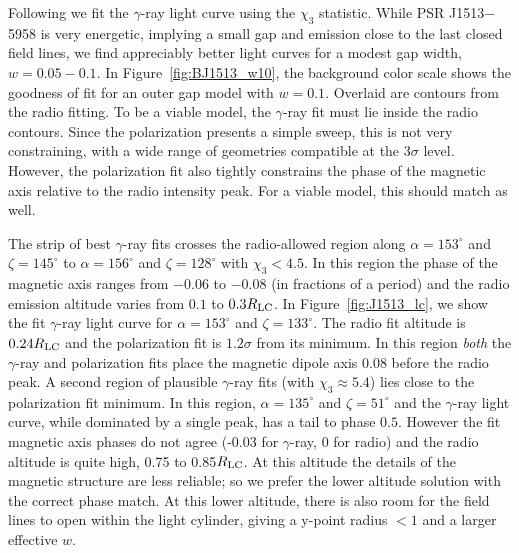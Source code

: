 Following \cite{romani2010constraining} we fit the $\gamma$-ray
light curve using the $\chi_3$ statistic. While PSR J1513$-$5958 is
very energetic, implying a small gap and emission close to the last closed
field lines, we find appreciably better light curves for a modest gap width,
$w=0.05-0.1$. In Figure~\ref{fig:BJ1513_w10}, the background color scale shows the goodness of
fit for an outer gap  model with $w=0.1$. Overlaid are
contours from the radio fitting. To be a viable model, the $\gamma$-ray fit
must lie inside the radio contours. Since the polarization presents a simple sweep, this
is not very constraining, with a wide range of geometries compatible at the
$3\sigma$ level. However, the polarization fit also tightly constrains
the phase of the magnetic axis relative to the radio intensity peak. For
a viable model, this should match as well.

The strip of best $\gamma$-ray fits crosses the radio-allowed region
along $\alpha=153^\circ$ and $\zeta=145^\circ$ to 
$\alpha=156^\circ$ and $\zeta=128^\circ$
with $\chi_3<4.5$. In
this region the phase of the magnetic axis ranges from $-0.06$ to $-0.08$
(in fractions of a period)
and the radio emission altitude varies from $0.1$ to $0.3R_{\rm LC}$.
In Figure~\ref{fig:J1513_lc}, we show the fit $\gamma$-ray light curve 
for $\alpha=153^\circ$ and $\zeta=133^\circ$.
The radio fit altitude is $0.24R_{\rm LC}$ and the polarization
fit is $1.2\sigma$ from its minimum. In this region {\it both}
the $\gamma$-ray and polarization fits place the magnetic dipole axis
0.08 before the radio peak.  A second region of plausible $\gamma$-ray fits
(with $\chi_3 \approx 5.4$) lies close to the polarization fit minimum.
In this region, $\alpha=135^\circ$ and $\zeta=51^\circ$ 
and the $\gamma$-ray light curve, while
dominated by a single peak, has a tail to phase $0.5$.  However the fit magnetic
axis phases do not agree (-0.03 for $\gamma$-ray, 0 for radio) and the radio
altitude is quite high, 0.75 to 0.85$R_{\rm LC}$. At this altitude the details
of the magnetic structure are less reliable; so we prefer the lower altitude
solution with the correct phase match. At this lower altitude, there is
also room for the field lines to open within the light cylinder, giving
a y-point radius $<1$ and a larger effective $w$.

